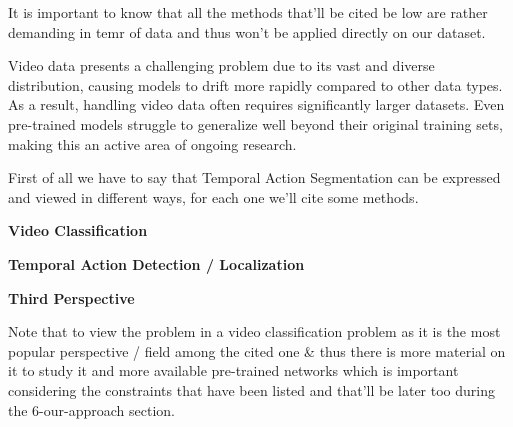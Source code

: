 It is important to know that all the methods that'll be cited be low are rather demanding in temr of data and thus won't be applied directly on our dataset.



Video data presents a challenging problem due to its vast and diverse distribution, causing models to drift more rapidly compared to other data types. As a result, handling video data often requires significantly larger datasets. Even pre-trained models struggle to generalize well beyond their original training sets, making this an active area of ongoing research.

First of all we have to say that Temporal Action Segmentation can be expressed and viewed in different ways, for each one we'll cite some methods.

\textbf{Video Classification}

\textbf{Temporal Action Detection / Localization}

\textbf{Third Perspective}

Note that to view the problem in a video classification problem as it is the most popular perspective / field among the cited one \& thus there is more material on it to study it and more available pre-trained networks which is important considering the constraints that have been listed and that'll be later too during the 6-our-approach section.

